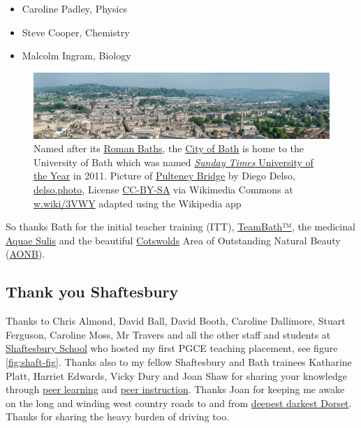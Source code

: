 \documentclass[
]{book}
\providecommand{\tightlist}{%
  \setlength{\itemsep}{0pt}\setlength{\parskip}{0pt}}
\begin{document}
\begin{itemize}
\tightlist
\item
  Caroline Padley, Physics
\item
  Steve Cooper, Chemistry
\item
  Malcolm Ingram, Biology
\end{itemize}

\begin{figure}

{\centering \includegraphics[width=1\linewidth]{images/bath-panorama} 

}

\caption{Named after its \href{https://en.wikipedia.org/wiki/Roman_Baths_(Bath)}{Roman Baths}, the \href{https://en.wikipedia.org/wiki/Bath,_Somerset}{City of Bath} is home to the University of Bath which was named \href{https://en.wikipedia.org/wiki/Sunday_Times_University_of_the_Year}{\emph{Sunday Times} University of the Year} in 2011. Picture of \href{https://en.wikipedia.org/wiki/Pulteney_Bridge}{Pulteney Bridge} by Diego Delso, \href{http://delso.photo/}{delso.photo}, License \href{https://creativecommons.org/licenses/by-sa/4.0/legalcode}{CC-BY-SA} via Wikimedia Commons at \href{https://w.wiki/3VWY}{w.wiki/3VWY} adapted using the Wikipedia app}\label{fig:bath-fig}
\end{figure}



So thanks Bath for the initial teacher training (ITT), \href{https://www.teambath.com/}{TeamBath™}, the medicinal \href{https://en.wikipedia.org/wiki/Aquae_Sulis}{Aquae Sulis} and the beautiful \href{https://en.wikipedia.org/wiki/Cotswolds}{Cotswolds} Area of Outstanding Natural Beauty (\href{https://en.wikipedia.org/wiki/Area_of_Outstanding_Natural_Beauty}{AONB}). 🙏

\hypertarget{shaftesbury}{%
\subsection{Thank you Shaftesbury}\label{shaftesbury}}

Thanks to Chris Almond, David Ball, David Booth, Caroline Dallimore, Stuart Ferguson, Caroline Moss, Mr Travers and all the other staff and students at \href{https://en.wikipedia.org/wiki/Shaftesbury_School}{Shaftesbury School} who hosted my first PGCE teaching placement, see figure \ref{fig:shaft-fig}. Thanks also to my fellow Shaftesbury and Bath trainees Katharine Platt, Harriet Edwards, Vicky Dury and Joan Shaw for sharing your knowledge through \href{https://en.wikipedia.org/wiki/Peer_learning}{peer learning} and \href{https://en.wikipedia.org/wiki/Peer_instruction}{peer instruction}. Thanks Joan for keeping me awake on the long and winding west country roads to and from \href{https://en.wikipedia.org/wiki/Dorset}{deepest darkest Dorset}. Thanks for sharing the heavy burden of driving too.
\end{document}
